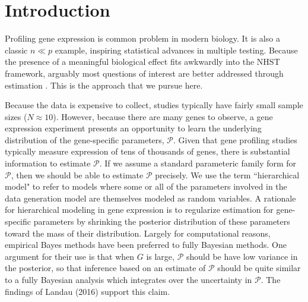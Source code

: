 \newcommand{\op}{\operatorname}
\newcommand{\ind}{\stackrel{ind.}{\sim}}
\section{Introduction}
Profiling gene expression is common problem in modern biology. It is also a classic $n \ll p$ example, inspiring statistical advances in multiple testing. Because the presence of a meaningful biological effect fits awkwardly into the NHST framework, arguably most questions of interest are better addressed through estimation \citet{deseq2014}. This is the approach that we pursue here.


Because the data is expensive to collect, studies typically have fairly small sample sizes ($N \approx 10$). However, because there are many genes to observe, a gene expression experiment presents an opportunity to learn the underlying distribution of the gene-specific parameters, $\mathcal{P}$. Given that gene profiling studies typically measure expression of tens of thousands of genes, there is substantial information to estimate $\mathcal{P}$. If we assume a standard parameteric family form for $\mathcal{P}$, then we should be able to estimate $\mathcal{P}$ precisely. We use the term ``hierarchical model" to refer to models where some or all of the parameters involved in the data generation model are themselves modeled as random variables.
A rationale for hierarchical modeling in gene expression is to regularize estimation for gene-specific parameters by shrinking the posterior distribution of these parameters toward the mass of their distribution. Largely for computational reasons, empirical Bayes methods have been preferred to fully Bayesian methods. One argument for their use is that when $G$ is large, $\mathcal{P}$ should be have low variance in the posterior, so that inference based on an estimate of $\mathcal{P}$ should be quite similar to a fully Bayesian analysis which integrates over the uncertainty in $\mathcal{P}$. The findings of Landau (2016) support this claim.

